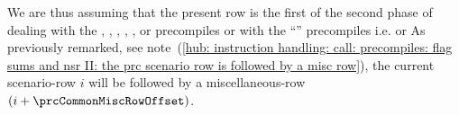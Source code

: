 \begin{center}
\end{center}
We are thus assuming that the present row is the first of the second phase of dealing with the 
\instEcrecover{},
\instShaTwo{},
\instRipemd{},
\instIdentity{},
\instEcadd{},
\instEcmul{} or
\instEcpairing{}
precompiles or with the ``\blsMod{}'' precompiles i.e.
\instPointEvaluation{}
\instBlsGOneAdd{}
\instBlsGOneMsm{}
\instBlsGTwoAdd{}
\instBlsGTwoMsm{}
\instBlsPairingCheck{}
\instBlsMapFpToGOne{} or
\instBlsMapFpTwoToGTwo{}
As previously remarked,
see note~(\ref{hub: instruction handling: call: precompiles: flag sums and nsr II: the prc scenario row is followed by a misc row}),
the current scenario-row $i$ will be followed by a miscellaneous-row $(i + \prcCommonMiscRowOffset)$.
